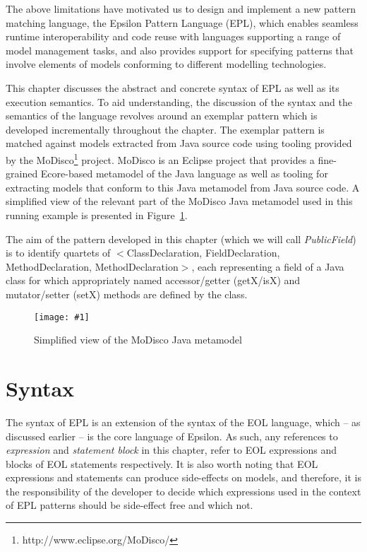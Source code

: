 The above limitations have motivated us to design and implement a new pattern matching language, the Epsilon Pattern Language (EPL), which enables seamless runtime interoperability and code reuse with languages supporting a range of model management tasks, and also provides support for specifying patterns that involve elements of models conforming to different modelling technologies.

\newcommand {\omnigraffle}[1] {
\texttt{[image: \#1]}
}

This chapter discusses the abstract and concrete syntax of EPL as well as its execution semantics. To aid understanding, the discussion of the syntax and the semantics of the language revolves around an exemplar pattern which is developed incrementally throughout the chapter. The exemplar pattern is matched against models extracted from Java source code using tooling provided by the MoDisco\footnote{http://www.eclipse.org/MoDisco/} project. MoDisco is an Eclipse project that provides a fine-grained Ecore-based metamodel of the Java language as well as tooling for extracting models that conform to this Java metamodel from Java source code. A simplified view of the relevant part of the MoDisco Java metamodel used in this running example is presented in Figure~\ref{fig:JavaMetamodel}.

The aim of the pattern developed in this chapter (which we will call \emph{PublicField}) is to identify quartets of $<$ClassDeclaration, FieldDeclaration, MethodDeclaration, MethodDeclaration$>$, each representing a field of a Java class for which appropriately named accessor/getter (getX/isX) and mutator/setter (setX) methods are defined by the class.

\begin{figure}[htbp]
\centering
\omnigraffle{images/Java.pdf}
\caption{Simplified view of the MoDisco Java metamodel}
\label{fig:JavaMetamodel}
\end{figure}

\section{Syntax}

The syntax of EPL is an extension of the syntax of the EOL language, which -- as discussed earlier -- is the core language of Epsilon. As such, any references to \emph{expression} and \emph{statement block} in this chapter, refer to EOL expressions and blocks of EOL statements respectively. It is also worth noting that EOL expressions and statements can produce side-effects on models, and therefore, it is the responsibility of the developer to decide which expressions used in the context of EPL patterns should be side-effect free and which not.

